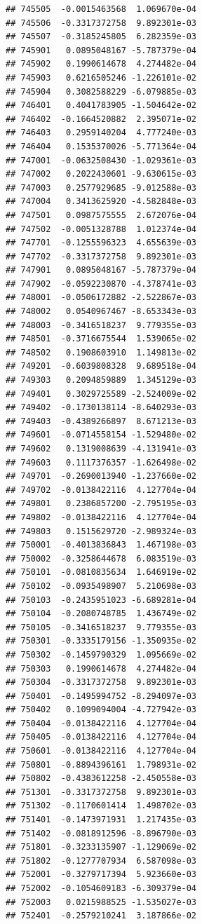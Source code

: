 \begin{frame}[fragile]
\begin{verbatim}
## 745505  -0.0015463568  1.069670e-04
## 745506  -0.3317372758  9.892301e-03
## 745507  -0.3185245805  6.282359e-03
## 745901   0.0895048167 -5.787379e-04
## 745902   0.1990614678  4.274482e-04
## 745903   0.6216505246 -1.226101e-02
## 745904   0.3082588229 -6.079885e-03
## 746401   0.4041783905 -1.504642e-02
## 746402  -0.1664520882  2.395071e-02
## 746403   0.2959140204  4.777240e-03
## 746404   0.1535370026 -5.771364e-04
## 747001  -0.0632508430 -1.029361e-03
## 747002   0.2022430601 -9.630615e-03
## 747003   0.2577929685 -9.012588e-03
## 747004   0.3413625920 -4.582848e-03
## 747501   0.0987575555  2.672076e-04
## 747502  -0.0051328788  1.012374e-04
## 747701  -0.1255596323  4.655639e-03
## 747702  -0.3317372758  9.892301e-03
## 747901   0.0895048167 -5.787379e-04
## 747902  -0.0592230870 -4.378741e-03
## 748001  -0.0506172882 -2.522867e-03
## 748002   0.0540967467 -8.653343e-03
## 748003  -0.3416518237  9.779355e-03
## 748501  -0.3716675544  1.539065e-02
## 748502   0.1908603910  1.149813e-02
## 749201  -0.6039808328  9.689518e-04
## 749303   0.2094859889  1.345129e-03
## 749401   0.3029725589 -2.524009e-02
## 749402  -0.1730138114 -8.640293e-03
## 749403  -0.4389266897  8.671213e-03
## 749601  -0.0714558154 -1.529480e-02
## 749602   0.1319008639 -4.131941e-03
## 749603   0.1117376357 -1.626498e-02
## 749701  -0.2690013940 -1.237660e-02
## 749702  -0.0138422116  4.127704e-04
## 749801   0.2386857200 -2.795195e-03
## 749802  -0.0138422116  4.127704e-04
## 749803   0.1515629720 -2.989324e-03
## 750001  -0.4013836843  1.467198e-03
## 750002  -0.3258644678  6.083519e-03
## 750101  -0.0810835634  1.646919e-02
## 750102  -0.0935498907  5.210698e-03
## 750103  -0.2435951023 -6.689281e-04
## 750104  -0.2080748785  1.436749e-02
## 750105  -0.3416518237  9.779355e-03
## 750301  -0.3335179156 -1.350935e-02
## 750302  -0.1459790329  1.095669e-02
## 750303   0.1990614678  4.274482e-04
## 750304  -0.3317372758  9.892301e-03
## 750401  -0.1495994752 -8.294097e-03
## 750402   0.1099094004 -4.727942e-03
## 750404  -0.0138422116  4.127704e-04
## 750405  -0.0138422116  4.127704e-04
## 750601  -0.0138422116  4.127704e-04
## 750801  -0.8894396161  1.798931e-02
## 750802  -0.4383612258 -2.450558e-03
## 751301  -0.3317372758  9.892301e-03
## 751302  -0.1170601414  1.498702e-03
## 751401  -0.1473971931  1.217435e-03
## 751402  -0.0818912596 -8.896790e-03
## 751801  -0.3233135907 -1.129069e-02
## 751802  -0.1277707934  6.587098e-03
## 752001  -0.3279717394  5.923660e-03
## 752002  -0.1054609183 -6.309379e-04
## 752003   0.0215988525 -1.535027e-03
## 752401  -0.2579210241  3.187866e-02

\end{verbatim}
\end{frame}
